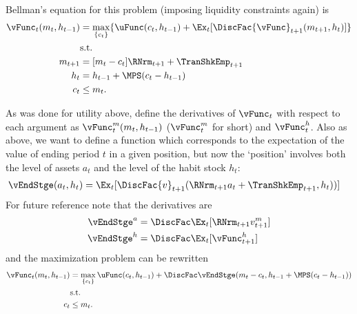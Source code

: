 \documentclass[\econtexRoot/SolvingMicroDSOPs]{subfiles}
\begin{document}
Bellman's equation for this problem (imposing liquidity constraints again) is
\begin{equation}\begin{gathered}\begin{aligned}
  {\vFunc}_{t}({m}_{t},h_{t-1})  & = \max_{\{{c}_{t}\}}  \{\uFunc({c}_{t},h_{t-1}) +
                                   \Ex_{t}[\DiscFac  {\vFunc}_{t+1}({m}_{t+1},h_{t}) ]\}
  \\ & \text{s.t.} \nonumber \\
  {m}_{t+1}  & = [{m}_{t}-{c}_{t}]\RNrm_{t+1} + \TranShkEmp_{t+1}\\
  h_{t}  & = h_{t-1} + \MPS ({c}_{t} - h_{t-1} ) \\
  {c}_{t} & \leq  {m}_{t} .
\end{aligned}\end{gathered}\end{equation}

As was done for utility above, define the derivatives of ${\vFunc}_{t}$ with
respect to each argument as ${\vFunc}_{t}^{m}({m}_{t},h_{t-1})$ (${\vFunc}_{t}^{m}$
for short) and ${\vFunc}_{t}^{h}$.  Also as above, we want to
define a function which corresponds to the expectation of the value of
ending period $t$ in a given position, but now the `position'
involves both the level of assets ${a}_{t}$ and the level of the habit
stock $h_{t}$:
\begin{equation}\begin{gathered}\begin{aligned}
  \vEndStge({a}_{t},h_{t})  & = \Ex_{t}[\DiscFac {v}_{t+1}(\RNrm_{t+1} {a}_{t}+{\TranShkEmp}_{t+1},h_{t}))]
\end{aligned}\end{gathered}\end{equation}
For future reference note that the derivatives are
\begin{equation}\begin{gathered}\begin{aligned}
  \vEndStge^{{a}}  & = \DiscFac \Ex_{t} [\RNrm_{t+1} {v}_{t+1}^{m}] \label{eq:vEndsdefn} \\
  \vEndStge^{h}  & = \DiscFac \Ex_{t} [{\vFunc}_{t+1}^{h}] 
\end{aligned}\end{gathered}\end{equation}
and the maximization problem can be rewritten
\begin{equation}\begin{gathered}\begin{aligned}
  {\vFunc}_{t}({m}_{t},h_{t-1})
  & =                                         \max_{\{{c}_{t}\}} %
    \uFunc({c}_{t},h_{t-1})  +  \DiscFac
    \vEndStge({m}_{t}-{c}_{t},h_{t-1}+\MPS({c}_{t}-h_{t-1}))
  \\        & \text{s.t.} \nonumber
  \\  {c}_{t} & \leq  {m}_{t}.
\end{aligned}\end{gathered}\end{equation}
\end{document}
